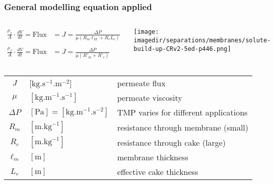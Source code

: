 \begin{frame}\frametitle{General modelling equation applied}
	
	\begin{columns}[c]
			\[
				\begin{array}{rl}
					\displaystyle\frac{\rho_f}{A}\cdot\frac{dV}{dt} = \text{Flux} &= J = \displaystyle \frac{\Delta P}{\mu \left(R_m \ell_M + R_c L_c \right)} \\
					\\					
					\displaystyle\frac{\rho_f}{A}\cdot\frac{dV}{dt} = \text{Flux} &= J = \displaystyle \frac{\Delta P}{\mu \left(R'_m + R'_c \right)} 
				\end{array}
			\]
			\begin{center}
				\texttt{[image: \\imagedir/separations/membranes/solute-build-up-CRv2-5ed-p446.png]}
			\end{center}
	\end{columns}
	\vspace{-12pt}
	\begin{tabular}{cll}
		$J$			&	[$\text{kg}.\text{s}^{-1}\text{.m}^{-2}$] 				& permeate flux \\
		$\mu$ 		&  	$[\text{kg}.\text{m}^{-1}\text{.s}^{-1}]$				& permeate viscosity\\
		$\Delta P$	&	$[\text{Pa}] = [\text{kg}.\text{m}^{-1}\text{.s}^{-2}]$ & TMP varies for different applications\\		
		$R_m$ 		&  	$[\text{m}.\text{kg}^{-1}]$								& resistance through membrane (small)\\
		$R_c$ 		&  	$[\text{m}.\text{kg}^{-1}]$								& resistance through cake (large)\\
		$\ell_m$ 	&   $[\text{m}]$											& membrane thickness\\
		$L_c$ 		&   $[\text{m}]$											& effective cake thickness
	\end{tabular}
\end{frame}

